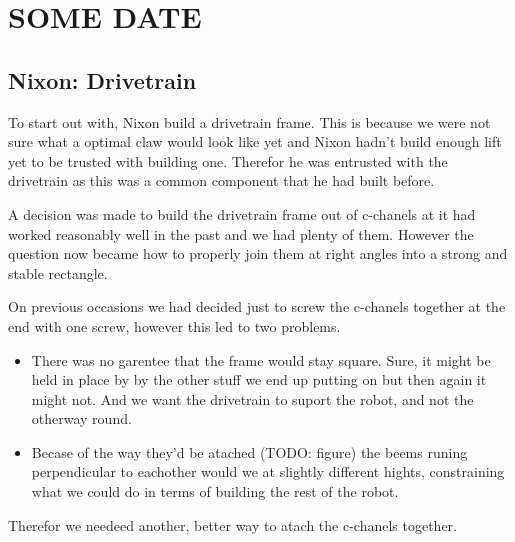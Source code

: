 \documentclass[../../../main.tex]{subfiles}
\begin{document}
\section{SOME DATE}

\subsection{Nixon: Drivetrain}

To start out with, Nixon build a drivetrain frame.
This is because we were not sure what a optimal claw would look like yet and Nixon hadn't build enough lift yet to be trusted with building one.
Therefor he was entrusted with the drivetrain as this was a common component that he had built before.
\par

A decision was made to build the drivetrain frame out of c-chanels at it had worked reasonably well in the past and we had plenty of them.
However the question now became how to properly join them at right angles into a strong and stable rectangle.
\par

On previous occasions we had decided just to screw the c-chanels together at the end with one screw, however this led to two problems.
\par

\begin{itemize}
	\item There was no garentee that the frame would stay square.
	      Sure, it might be held in place by by the other stuff we end up putting on but then again it might not.
	      And we want the drivetrain to suport the robot, and not the otherway round.
	\item Becase of the way they'd be atached (TODO: figure) the beems
	      runing perpendicular to eachother would we at slightly different hights,
	      constraining what we could do in terms of building the rest of the robot.
\end{itemize}

Therefor we needeed another, better way to atach the c-chanels together.



\end{document}
